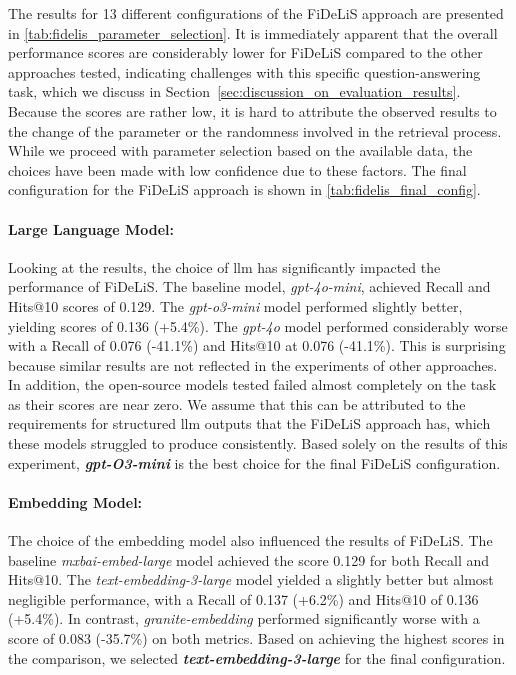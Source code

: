 The results for 13 different configurations of the FiDeLiS approach are presented in \autoref{tab:fidelis_parameter_selection}. It is immediately apparent that the overall performance scores are considerably lower for FiDeLiS compared to the other approaches tested, indicating challenges with this specific question-answering task, which we discuss in Section~\ref{sec:discussion_on_evaluation_results}. Because the scores are rather low, it is hard to attribute the observed results to the change of the parameter or the randomness involved in the retrieval process. While we proceed with parameter selection based on the available data, the choices have been made with low confidence due to these factors. The final configuration for the FiDeLiS approach is shown in \autoref{tab:fidelis_final_config}.

\paragraph{Large Language Model:} 
Looking at the results, the choice of \gls{llm} has significantly impacted the performance of FiDeLiS. The baseline model, \emph{gpt-4o-mini}, achieved Recall and Hits@10 scores of 0.129. The \emph{gpt-o3-mini} model performed slightly better, yielding scores of 0.136 (+5.4\%). The \emph{gpt-4o} model performed considerably worse with a Recall of 0.076 (-41.1\%) and Hits@10 at 0.076 (-41.1\%). This is surprising because similar results are not reflected in the experiments of other approaches. In addition, the open-source models tested failed almost completely on the task as their scores are near zero. We assume that this can be attributed to the requirements for structured \gls{llm} outputs that the FiDeLiS approach has, which these models struggled to produce consistently. Based solely on the results of this experiment, \textbf{\emph{gpt-O3-mini}} is the best choice for the final FiDeLiS configuration.

\paragraph{Embedding Model:} 
The choice of the embedding model also influenced the results of FiDeLiS. The baseline \emph{mxbai-embed-large} model achieved the score 0.129 for both Recall and Hits@10. The \emph{text-embedding-3-large} model yielded a slightly better but almost negligible performance, with a Recall of 0.137 (+6.2\%) and Hits@10 of 0.136 (+5.4\%). In contrast, \emph{granite-embedding} performed significantly worse with a score of 0.083 (-35.7\%) on both metrics. Based on achieving the highest scores in the comparison, we selected \textbf{\emph{text-embedding-3-large}} for the final configuration.

